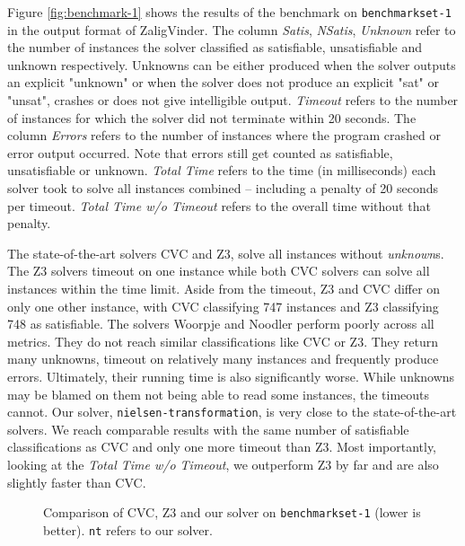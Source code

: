 Figure \ref{fig:benchmark-1} shows the results of the benchmark on \texttt{benchmarkset-1} in the output format of ZaligVinder. The column \textit{Satis}, \textit{NSatis}, \textit{Unknown} refer to the number of instances the solver classified as satisfiable, unsatisfiable and unknown respectively. Unknowns can be either produced when the solver outputs an explicit "unknown" or when the solver does not produce an explicit "sat" or "unsat", crashes or does not give intelligible output. \textit{Timeout} refers to the number of instances for which the solver did not terminate within 20 seconds. The column \textit{Errors} refers to the number of instances where the program crashed or error output occurred. Note that errors still get counted as satisfiable, unsatisfiable or unknown. \textit{Total Time} refers to the time (in milliseconds) each solver took to solve all instances combined -- including a penalty of 20 seconds per timeout. \textit{Total Time w/o Timeout} refers to the overall time without that penalty.

The state-of-the-art solvers CVC and Z3, solve all instances without \textit{unknown}s. The Z3 solvers timeout on one instance while both CVC solvers can solve all instances within the time limit. Aside from the timeout, Z3 and CVC differ on only one other instance, with CVC classifying 747 instances and Z3 classifying 748 as satisfiable.
The solvers Woorpje and Noodler perform poorly across all metrics. They do not reach similar classifications like CVC or Z3. They return many unknowns, timeout on relatively many instances and frequently produce errors. Ultimately, their running time is also significantly worse. While unknowns may be blamed on them not being able to read some instances, the timeouts cannot.
Our solver, \texttt{nielsen-transformation}, is very close to the state-of-the-art solvers. We reach comparable results with the same number of satisfiable classifications as CVC and only one more timeout than Z3. Most importantly, looking at the \textit{Total Time w/o Timeout}, we outperform Z3 by far and are also slightly faster than CVC.

\begin{figure}%
\begin{center}
\resizebox{0.6 \textwidth}{!}{

}
\caption{Comparison of CVC, Z3 and our solver on \texttt{benchmarkset-1} (lower is better). \texttt{nt} refers to our solver.}
\label{fig:barplot-1}
\end{center}
\end{figure}

